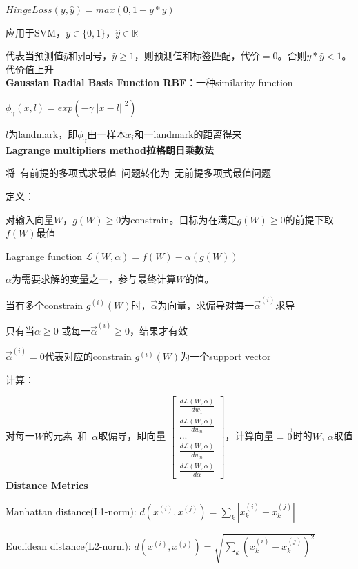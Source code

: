 \documentclass[UTF8]{ctexart}
\begin{document}
  $HingeLoss(y, \hat{y}) = max(0, 1-y*\hat{y})$

  应用于SVM，$y \in \{0, 1\}$，$\hat{y} \in \mathbb{R} $
  
  代表当预测值$\hat{y}$和y同号，$\hat{y} \geq 1$，则预测值和标签匹配，代价$=0$。否则$y*\hat{y} < 1$。代价值上升\\
\textbf{Gaussian Radial Basis Function RBF}：一种similarity function

  $\phi_{\gamma}(x, l) = exp(-\gamma||x-l||^2)$

  \quad $l$为landmark，即$\phi_{\gamma}$由一样本$x_i$和一landmark的距离得来\\
\textbf{Lagrange multipliers method拉格朗日乘数法}

  将\ 有前提的多项式求最值\ 问题转化为\ 无前提多项式最值问题

  定义：

  \quad 对输入向量$W$，$g(W) \geq 0$为constrain。目标为在满足$g(W) \geq 0$的前提下取$f(W)$最值

  \quad Lagrange function $\mathcal{L} (W, \alpha) = f(W) - \alpha(g(W))$

  \quad \quad $\alpha$为需要求解的变量之一，参与最终计算$W$的值。

  \quad \quad 当有多个constrain $g^{(i)}(W)$时，$\vec{\alpha}$为向量，求偏导对每一$\vec{\alpha}^{(i)}$求导

  \quad \quad 只有当$\alpha \geq 0$ 或每一$\vec{\alpha}^{(i)} \geq 0$，结果才有效

  \quad \quad $\vec{\alpha}^{(i)} = 0$代表对应的constrain $g^{(i)}(W)$为一个support vector

  计算：
  
  \quad 对每一$W$的元素\ 和\ $\alpha$取偏导，即向量
  $\begin{bmatrix}
    \frac{d \mathcal{L}(W, \alpha)}{d w_1}  \\
    \frac{d \mathcal{L}(W, \alpha)}{d w_n} \\
    ... \\
    \frac{d \mathcal{L}(W, \alpha)}{d w_n} \\
    \frac{d \mathcal{L}(W, \alpha)}{d \alpha}
  \end{bmatrix}$，计算向量$=\vec{0} $时的$W$, $\alpha$取值\\
\textbf{Distance Metrics}

  Manhattan distance(L1-norm): $d(x^{(i)}, x^{(j)}) = \sum_k |x^{(i)}_k - x^{(j)}_k|$

  Euclidean distance(L2-norm): $d(x^{(i)}, x^{(j)}) = \sqrt{\sum_k (x^{(i)}_k - x^{(j)}_k) ^ 2}$
\end{document}
